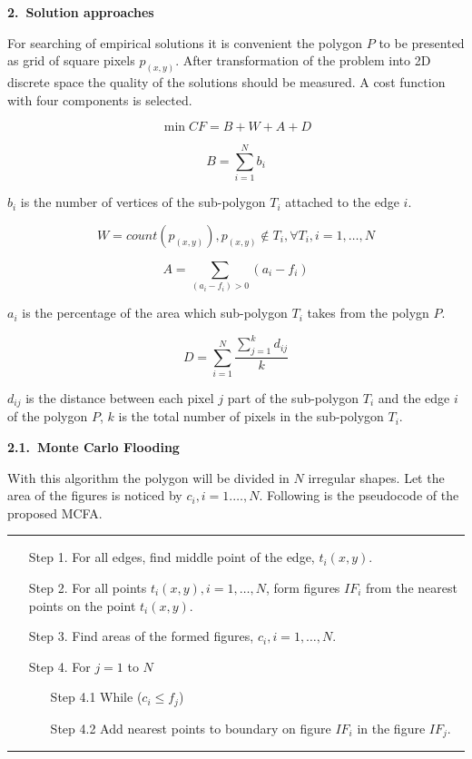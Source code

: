 \documentclass[11pt,leqno]{book}
\newcommand{\sect}[1]{\vskip7mm\par{\large \bf #1}}
\newcommand{\subsect}[1]{\vskip 3mm\par{\bf#1}}
\begin{document}
\sect{2.~Solution approaches}

For searching of empirical solutions it is convenient the polygon $P$ to be presented as grid of square pixels $p_{(x,y)}$. After transformation of the problem into 2D discrete space the quality of the solutions should be measured. A cost function with four components is selected. 

$$\min CF = B + W + A + D$$

$$B = \sum_{i=1}^N b_i$$

$b_i$ is the number of vertices of the sub-polygon $T_i$ attached to the edge $i$.

$$W= count( p_{(x,y)} ), p_{(x,y)} \notin T_i, \forall{ T_i}, i=1, \dots, N$$

$$A = \sum_{(a_i - f_i)>0}(a_i - f_i)$$

$a_i$ is the percentage of the area which sub-polygon $T_i$ takes from the polygn $P$.

$$D = \sum_{i=1}^N \frac{\sum_{j=1}^k d_{ij}}k$$

$d_{ij}$ is the distance between each pixel $j$ part of the sub-polygon $T_i$ and the edge $i$ of the polygon $P$, $k$ is the total number of pixels in the sub-polygon $T_i$.

\subsect{2.1.~Monte Carlo Flooding}

With this algorithm the polygon will be divided in $N$ irregular shapes. Let the area of the figures is noticed by $c_i, i = 1. \ldots, N$.  Following is the pseudocode of the proposed MCFA.

\noindent\rule{\textwidth}{1pt}
\begin{itemize}
\item[Step 1.]  For all edges, find middle point of the edge, $t_i(x,y)$.
\item[Step 2.]  For all points $t_i(x,y), i=1,\ldots, N$, form figures $IF_i$ from the nearest points on the point $t_i(x,y)$. 
\item[Step 3.] Find areas of the formed figures, $c_i, i = 1, \ldots, N$.
\item[Step 4.] For $j = 1$ to $N$
\begin{itemize}
  \item[Step 4.1]  While ($c_i \leq f_j$)
  \item[Step 4.2]  Add nearest points to boundary on figure $IF_i$ in the figure $IF_j$. 
\end{itemize}
\end{itemize}
\noindent\rule{\textwidth}{1pt}
\end{document}
